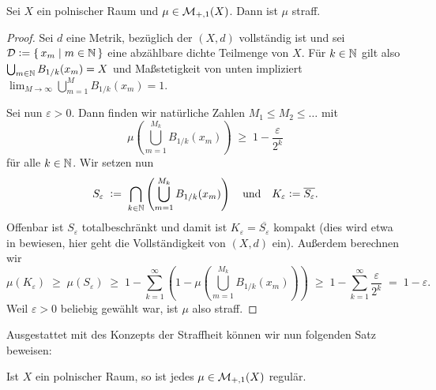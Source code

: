 \documentclass[../main/main.tex]{subfiles}
\begin{document}
	\begin{Satz}
		\label{thm:tightness}
		Sei $X$ ein polnischer Raum und $\mu \in \mathcal{M}_{+,1}(X)$. Dann ist $\mu$ straff.
	\end{Satz}
	
	\begin{proof}
		Sei $d$ eine Metrik, bezüglich der $(X, d)$ vollständig ist und sei 
		$\mathcal{D} \vcentcolon = \left\{\, x_m \; \middle| \; m \in \mathbb{N} \,\right\}$ eine abzählbare dichte Teilmenge von $X$. 
		Für $k \in \mathbb{N}$ gilt also $\bigcup_{m \in \mathbb{N}} B_{1/k}(x_m) = X$ und Maßstetigkeit 
		von unten impliziert 
		$\lim_{M \to \infty} \bigcup_{m=1}^{M} B_{1/k}(x_m) = 1$.
		
		Sei nun $\varepsilon > 0$. Dann finden wir natürliche Zahlen $M_1 \leq M_2 \leq \dots$ mit
		\[ \mu\left( \bigcup_{m=1}^{M_k} B_{1/k}(x_m) \right) \; \geq \; 1 - \frac{\varepsilon}{2^k} \]
		für alle $k \in \mathbb{N}$. Wir setzen nun
		\[ S_\varepsilon 
		\; \vcentcolon = \; \bigcap_{k \in \mathbb{N}} \left( \bigcup_{m=1}^{M_k} B_{1/k}(x_m) \right) 
		\quad \text{und} \quad K_\varepsilon \vcentcolon = \overline{S_\varepsilon} \text{.} \]
		Offenbar ist $S_\varepsilon$ totalbeschränkt und damit ist $K_\varepsilon = \overline{S_\varepsilon}$ 
		kompakt (dies wird etwa in \cite[Satz 2.3.8]{Simon.2015} bewiesen, 
		hier geht die Vollständigkeit von $(X, d)$ ein).
		Außerdem berechnen wir
		\[ \mu(K_\varepsilon) 
		\; \geq \; \mu(S_\varepsilon) 
		\; \geq \; 1 - \sum_{k=1}^{\infty} \left( 1 - \mu\left( \bigcup_{m=1}^{M_k} B_{1/k}(x_m) \right) \right) 
		\; \geq \; 1 - \sum_{k=1}^{\infty} \frac{\varepsilon}{2^k} \; = \; 1 - \varepsilon \text{.} \]
		Weil $\varepsilon > 0$ beliebig gewählt war, ist $\mu$ also straff.
	\end{proof}
	
	Ausgestattet mit des Konzepts der Straffheit können wir nun folgenden Satz beweisen:
	
	\begin{Korollar}
		Ist $X$ ein polnischer Raum, so ist jedes $\mu \in \mathcal{M}_{+,1}(X)$ regulär.
	\end{Korollar}
	
\end{document}

